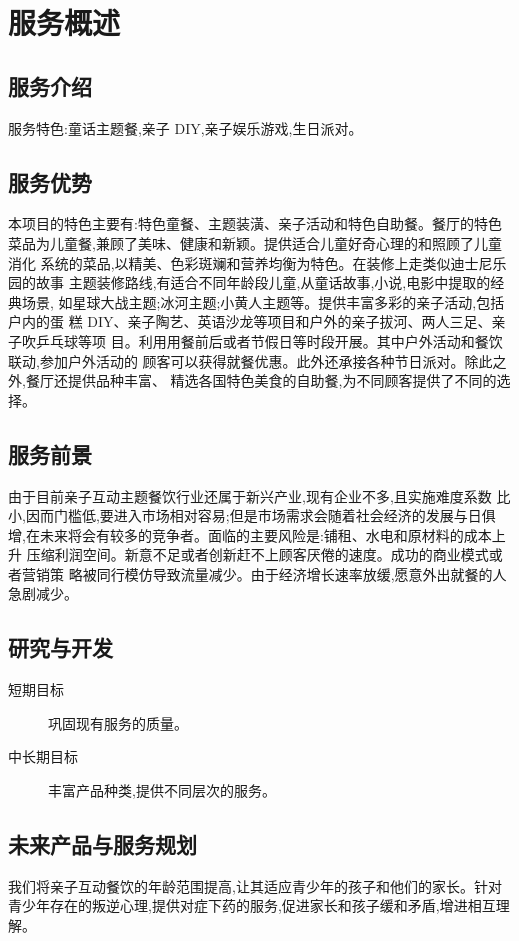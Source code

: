 \section{服务概述}

\subsection{服务介绍}
服务特色:童话主题餐,亲子 DIY,亲子娱乐游戏,生日派对。

\subsection{服务优势}
本项目的特色主要有:特色童餐、主题装潢、亲子活动和特色自助餐。餐厅的特色
菜品为儿童餐,兼顾了美味、健康和新颖。提供适合儿童好奇心理的和照顾了儿童消化
系统的菜品,以精美、色彩斑斓和营养均衡为特色。在装修上走类似迪士尼乐园的故事
主题装修路线,有适合不同年龄段儿童,从童话故事,小说,电影中提取的经典场景,
如星球大战主题;冰河主题;小黄人主题等。提供丰富多彩的亲子活动,包括户内的蛋
糕 DIY、亲子陶艺、英语沙龙等项目和户外的亲子拔河、两人三足、亲子吹乒乓球等项
目。利用用餐前后或者节假日等时段开展。其中户外活动和餐饮联动,参加户外活动的
顾客可以获得就餐优惠。此外还承接各种节日派对。除此之外,餐厅还提供品种丰富、
精选各国特色美食的自助餐,为不同顾客提供了不同的选择。

\subsection{服务前景}
由于目前亲子互动主题餐饮行业还属于新兴产业,现有企业不多,且实施难度系数
比小,因而门槛低,要进入市场相对容易;但是市场需求会随着社会经济的发展与日俱
增,在未来将会有较多的竞争者。面临的主要风险是:铺租、水电和原材料的成本上升
压缩利润空间。新意不足或者创新赶不上顾客厌倦的速度。成功的商业模式或者营销策
略被同行模仿导致流量减少。由于经济增长速率放缓,愿意外出就餐的人急剧减少。

\subsection{研究与开发}
\begin{description}
        \item[短期目标] 巩固现有服务的质量。
        \item[中长期目标] 丰富产品种类,提供不同层次的服务。
\end{description}

\subsection{未来产品与服务规划}
我们将亲子互动餐饮的年龄范围提高,让其适应青少年的孩子和他们的家长。针对
青少年存在的叛逆心理,提供对症下药的服务,促进家长和孩子缓和矛盾,增进相互理
解。

